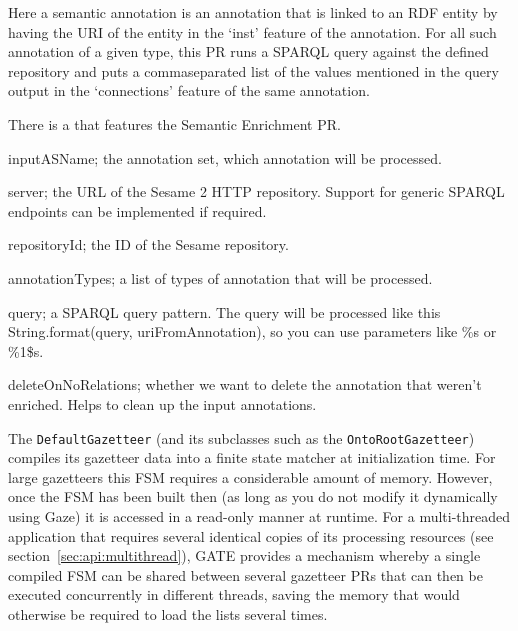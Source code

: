 Here a semantic annotation is an annotation that is linked to an RDF entity by
having the URI of the entity in the `inst' feature of the annotation. For all
such annotation of a given type, this PR runs a SPARQL query against the
defined repository and puts a commaseparated list of the values
mentioned in the query output in the `connections' feature of the same
annotation.

There is a  that features the Semantic Enrichment PR.


\begin{plist}

\item{} inputASName; the annotation set, which annotation will be
processed.

\item{} server; the URL of the Sesame 2 HTTP repository. Support
for generic SPARQL endpoints can be implemented if required.

\item{} repositoryId; the ID of the Sesame repository.

\item{} annotationTypes; a list of types of annotation that will be
processed.

\item{} query; a SPARQL query pattern. The query will be processed
like this  String.format(query, uriFromAnnotation), so you can use
parameters like \%s or \%1\$s.

\item{} deleteOnNoRelations; whether we want to delete the
annotation that weren't enriched. Helps to clean up the input annotations.

\end{plist}




The \texttt{DefaultGazetteer} (and its subclasses such as the
\texttt{OntoRootGazetteer}) compiles its gazetteer data into a finite state
matcher at initialization time.  For large gazetteers this FSM requires a
considerable amount of memory.  However, once the FSM has been built then (as
long as you do not modify it dynamically using Gaze) it is accessed in a
read-only manner at runtime.  For a multi-threaded application that requires
several identical copies of its processing resources (see
section~\ref{sec:api:multithread}), GATE provides a mechanism whereby a
single compiled FSM can be shared between several gazetteer PRs that can then
be executed concurrently in different threads, saving the memory that would
otherwise be required to load the lists several times.

